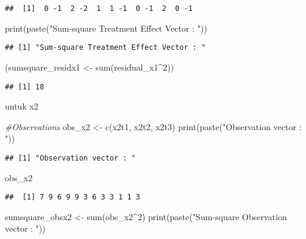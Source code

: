 \documentclass[
]{article}
\newenvironment{Shaded}{\begin{snugshade}}{\end{snugshade}}
\newcommand{\CommentTok}[1]{\textcolor[rgb]{0.56,0.35,0.01}{\textit{#1}}}
\newcommand{\DecValTok}[1]{\textcolor[rgb]{0.00,0.00,0.81}{#1}}
\newcommand{\FunctionTok}[1]{\textcolor[rgb]{0.00,0.00,0.00}{#1}}
\newcommand{\NormalTok}[1]{#1}
\newcommand{\OtherTok}[1]{\textcolor[rgb]{0.56,0.35,0.01}{#1}}
\newcommand{\SpecialCharTok}[1]{\textcolor[rgb]{0.00,0.00,0.00}{#1}}
\newcommand{\StringTok}[1]{\textcolor[rgb]{0.31,0.60,0.02}{#1}}
\begin{document}
\begin{verbatim}
##  [1]  0 -1  2 -2  1  1 -1  0 -1  2  0 -1
\end{verbatim}

\begin{Shaded}
\begin{Highlighting}[]
\FunctionTok{print}\NormalTok{(}\FunctionTok{paste}\NormalTok{(}\StringTok{"Sum{-}square Treatment Effect Vector : "}\NormalTok{))}
\end{Highlighting}
\end{Shaded}

\begin{verbatim}
## [1] "Sum-square Treatment Effect Vector : "
\end{verbatim}

\begin{Shaded}
\begin{Highlighting}[]
\NormalTok{(sumsquare\_residx1 }\OtherTok{\textless{}{-}} \FunctionTok{sum}\NormalTok{(residual\_x1}\SpecialCharTok{\^{}}\DecValTok{2}\NormalTok{))}
\end{Highlighting}
\end{Shaded}

\begin{verbatim}
## [1] 18
\end{verbatim}

untuk x2

\begin{Shaded}
\begin{Highlighting}[]
\CommentTok{\#Observations}
\NormalTok{obs\_x2 }\OtherTok{\textless{}{-}} \FunctionTok{c}\NormalTok{(x2t1, x2t2, x2t3)}
\FunctionTok{print}\NormalTok{(}\FunctionTok{paste}\NormalTok{(}\StringTok{"Observation vector : "}\NormalTok{))}
\end{Highlighting}
\end{Shaded}

\begin{verbatim}
## [1] "Observation vector : "
\end{verbatim}

\begin{Shaded}
\begin{Highlighting}[]
\NormalTok{obs\_x2}
\end{Highlighting}
\end{Shaded}

\begin{verbatim}
##  [1] 7 9 6 9 9 3 6 3 3 1 1 3
\end{verbatim}

\begin{Shaded}
\begin{Highlighting}[]
\NormalTok{sumsquare\_obsx2 }\OtherTok{\textless{}{-}} \FunctionTok{sum}\NormalTok{(obs\_x2}\SpecialCharTok{\^{}}\DecValTok{2}\NormalTok{)}
\FunctionTok{print}\NormalTok{(}\FunctionTok{paste}\NormalTok{(}\StringTok{"Sum{-}square Observation vector : "}\NormalTok{))}
\end{Highlighting}
\end{Shaded}
\end{document}
